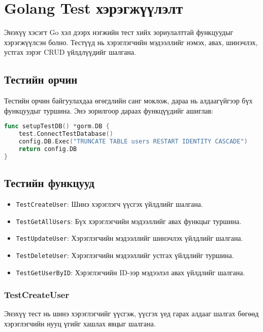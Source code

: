 \section{Golang Test хэрэгжүүлэлт}

Энэхүү хэсэгт Go хэл дээрх нэгжийн тест хийх зориулалттай функцуудыг хэрэгжүүлсэн болно. Тестүүд нь хэрэглэгчийн мэдээллийг нэмэх, авах, шинэчлэх, устгах зэрэг CRUD үйлдлүүдийг шалгана.



\subsection{Тестийн орчин}

Тестийн орчин байгуулахдаа өгөгдлийн санг моклож, дараа нь алдаагүйгээр бүх функцуудыг туршина. Энэ зорилгоор дараах функцүүдийг ашиглав:

\begin{lstlisting}[language=Go, caption=Test Database Setup, frame=single]
func setupTestDB() *gorm.DB {
    test.ConnectTestDatabase()
    config.DB.Exec("TRUNCATE TABLE users RESTART IDENTITY CASCADE") 
    return config.DB
}
\end{lstlisting}

\subsection{Тестийн функцууд}

\begin{itemize}
    \item \texttt{TestCreateUser}: Шинэ хэрэглэгч үүсгэх үйлдлийг шалгана.
    \item \texttt{TestGetAllUsers}: Бүх хэрэглэгчийн мэдээллийг авах функцыг туршина.
    \item \texttt{TestUpdateUser}: Хэрэглэгчийн мэдээллийг шинэчлэх үйлдлийг шалгана.
    \item \texttt{TestDeleteUser}: Хэрэглэгчийн мэдээллийг устгах үйлдлийг туршина.
    \item \texttt{TestGetUserByID}: Хэрэглэгчийн ID-ээр мэдээлэл авах үйлдлийг шалгана.
\end{itemize}

\subsubsection{TestCreateUser}

Энэхүү тест нь шинэ хэрэглэгчийг үүсгэж, үүсгэх үед гарах алдааг шалгах бөгөөд хэрэглэгчийн нууц үгийг хашлах явцыг шалгана.

